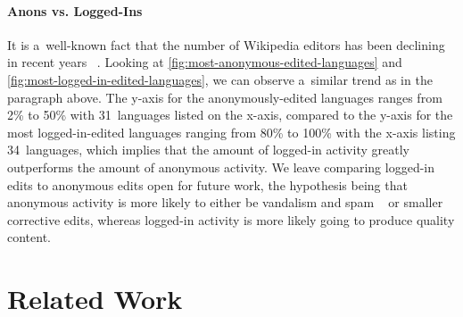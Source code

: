 \documentclass{sig-alternate}
\begin{document}
\paragraph{Anons vs. Logged-Ins}

It is a~well-known fact that the number of Wikipedia editors
has been declining in recent years%
~\cite{halfaker2013wikipedia}.
Looking at \autoref{fig:most-anonymous-edited-languages} and
\autoref{fig:most-logged-in-edited-languages},
we can observe a~similar trend as in the paragraph above.
The y-axis for the anonymously-edited languages
ranges from 2\% to 50\% with 31~languages listed on the x-axis,
compared to the y-axis for the most logged-in-edited languages
ranging from 80\% to 100\% with the x-axis listing 34~languages,
which implies that the amount of logged-in activity
greatly outperforms the amount of anonymous activity.
We leave comparing logged-in edits to anonymous edits 
open for future work, the hypothesis being that anonymous activity
is more likely to either be vandalism and spam%
~\cite{alfonseca2013spam} or smaller corrective edits,
whereas logged-in activity is more likely
going to produce quality content.

\section{Related Work}
\end{document}

